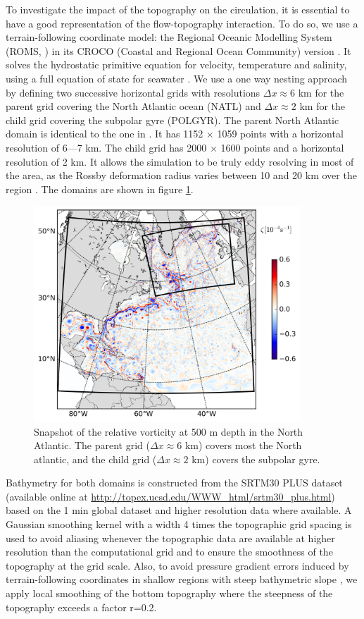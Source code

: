 \documentclass[11pt,a4paper]{article}
\begin{document}
To investigate the impact of the topography on the circulation, it is essential to have a good representation of the flow-topography interaction. To do so, we use a terrain-following coordinate model: the Regional Oceanic Modelling System (ROMS, \citet{shchepetkin2009}) in its CROCO (Coastal and Regional Ocean Community) version \citep{debreu2012}. It solves the hydrostatic primitive equation for velocity, temperature and salinity, using a full equation of state for seawater \citep{shchepetkin2009,shchepetkin2011}. We use a one way nesting approach by defining two successive horizontal grids with resolutions $\Delta x \approx 6$ km for the parent grid covering the North Atlantic ocean (NATL) and $\Delta x \approx 2$ km for the child grid covering the subpolar gyre (POLGYR). The parent North Atlantic domain is identical to the one in \citep{renault2016}. It has 1152 $\times$ 1059 points  with a horizontal resolution of 6---7 km. The child grid has 2000 $\times$ 1600 points and a horizontal resolution of 2 km. It allows the simulation to be truly eddy resolving in most of the area, as the Rossby deformation radius varies between 10 and 20 km over the region \citep{chelton1998}. The domains are shown in figure \ref{domain}. 

\begin{figure}[H]
\centerline{\includegraphics[width=10cm]{./fig/vrt500_and_nest.png}}
\caption{Snapshot of the relative vorticity at 500 m depth in the North Atlantic. The parent grid ($\Delta x \approx 6$ km) covers most the North atlantic, and the child grid ($\Delta x \approx 2$ km) covers the subpolar gyre.}
\label{domain}
\end{figure} 

Bathymetry for both domains is constructed from the SRTM30 PLUS dataset (available online at \url{http://topex.ucsd.edu/WWW_html/srtm30_plus.html}) based on the 1 min \citep{sandwell1997} global dataset and higher resolution data where available. A Gaussian smoothing kernel with a width 4 times the topographic grid spacing is used to avoid aliasing whenever the topographic data are available at higher resolution than the computational grid and to ensure the smoothness of the topography at the grid scale. Also, to avoid pressure gradient errors induced by terrain-following coordinates in shallow regions with steep bathymetric slope \citep{beckmann1993}, we apply local smoothing of the bottom topography where the steepness of the topography exceeds a factor r=0.2. 
\end{document}
